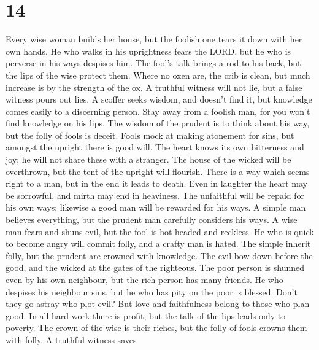 \hypertarget{section-13}{%
\section{14}\label{section-13}}

 Every wise woman builds her house, but the foolish one
tears it down with her own hands.  He who walks in his
uprightness fears the LORD, but he who is perverse in his ways despises
him.  The fool's talk brings a rod to his back, but the lips
of the wise protect them.  Where no oxen are, the crib is
clean, but much increase is by the strength of the ox.  A
truthful witness will not lie, but a false witness pours out lies.
 A scoffer seeks wisdom, and doesn't find it, but knowledge
comes easily to a discerning person.  Stay away from a
foolish man, for you won't find knowledge on his lips.  The
wisdom of the prudent is to think about his way, but the folly of fools
is deceit.  Fools mock at making atonement for sins, but
amongst the upright there is good will.  The heart knows
its own bitterness and joy; he will not share these with a stranger.
 The house of the wicked will be overthrown, but the tent
of the upright will flourish.  There is a way which seems
right to a man, but in the end it leads to death.  Even in
laughter the heart may be sorrowful, and mirth may end in heaviness.
 The unfaithful will be repaid for his own ways; likewise a
good man will be rewarded for his ways.  A simple man
believes everything, but the prudent man carefully considers his ways.
 A wise man fears and shuns evil, but the fool is hot
headed and reckless.  He who is quick to become angry will
commit folly, and a crafty man is hated.  The simple
inherit folly, but the prudent are crowned with knowledge. 
The evil bow down before the good, and the wicked at the gates of the
righteous.  The poor person is shunned even by his own
neighbour, but the rich person has many friends.  He who
despises his neighbour sins, but he who has pity on the poor is blessed.
 Don't they go astray who plot evil? But love and
faithfulness belong to those who plan good.  In all hard
work there is profit, but the talk of the lips leads only to poverty.
 The crown of the wise is their riches, but the folly of
fools crowns them with folly.  A truthful witness saves
